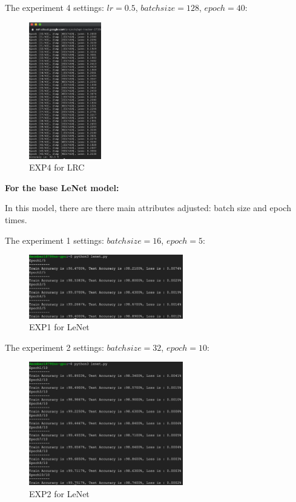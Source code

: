\documentclass{article}
\begin{document}
The experiment 4 settings: $lr=0.5$, $batch size=128$, $epoch=40$:
\begin{figure}[H]
    \centering
    \caption{EXP4 for LRC}
    \includegraphics[width=0.28\textwidth]{lrc_4}
\end{figure}

\textbf{For the base LeNet model:}

In this model, there are there main attributes adjusted: batch size and epoch times.

The experiment 1 settings: $batch size=16$, $epoch=5$:
\begin{figure}[H]
    \centering
    \caption{EXP1 for LeNet}
    \includegraphics[width=0.6\textwidth]{lenet_1}
\end{figure}

The experiment 2 settings: $batch size=32$, $epoch=10$:
\begin{figure}[H]
    \caption{EXP2 for LeNet}
    \centering
    \includegraphics[width=0.6\textwidth]{lenet_2}
\end{figure}
\end{document}
